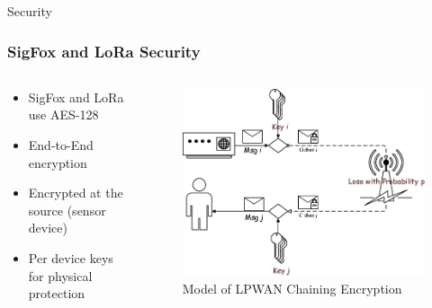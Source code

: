 \documentclass{beamer}
\begin{document}
  \begin{frame}{Security}
    \frametitle{SigFox and LoRa Security}
    \begin{columns}
      \begin{column}{0.5\textwidth}
        \begin{itemize}
          \item SigFox and LoRa use AES-128
          \item End-to-End encryption
          \item Encrypted at the source (sensor device)
          \item Per device keys for physical protection
        \end{itemize}
      \end{column}
      \begin{column}{0.5\textwidth}
        \begin{figure}[htbp]
          \centering
          \includegraphics[width=\textwidth]{Model-of-LPWAN-Chaining-Encryption.png}
          \caption{Model of LPWAN Chaining Encryption \cite{bidgoly2019novel}}
          \label{fig:LPWAN_encryption}
        \end{figure}
      \end{column}
    \end{columns}
  \end{frame}
\end{document}
